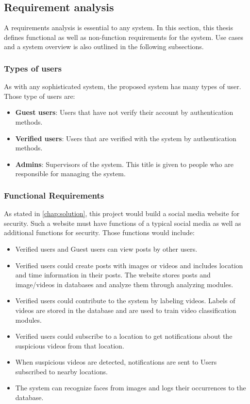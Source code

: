 \subsection{Requirement analysis}
A requirements analysis is essential to any system. In this section, this thesis defines functional as well as non-function requirements for the system. Use cases and a system overview is also outlined in the following subsections.
\subsubsection{Types of users}
As with any sophisticated system, the proposed system has many types of user. Those type of users are:

\begin{itemize}
    \item \textbf{Guest users}: Users that have not verify their account by authentication methods.
    \item \textbf{Verified users}: Users that are verified with the system by authentication methods.
    \item \textbf{Admins}: Supervisors of the system. This title is given to people who are responsible for managing the system.
\end{itemize}
\subsubsection{Functional Requirements}
As stated in \ref{chap:solution}, this project would build a social media website for security. Such a website must have functions of a typical social media as well as additional functions for security. Those functions would include:
\begin{itemize}	
    \item Verified users and Guest users can view posts by other users. 
    \item Verified users could create posts with images or videos and includes location and time information in their posts. The website stores posts and image/videos in databases and analyze them through analyzing modules.
    \item Verified users could contribute to the system by labeling videos. Labels of videos are stored in the database and are used to train video classification modules.
    \item Verified users could subscribe to a location to get notifications about the suspicious videos from that location.
    \item When suspicious videos are detected, notifications are sent to Users subscribed to nearby locations.
    \item The system can recognize faces from images and logs their occurrences to the database.
\end{itemize}


